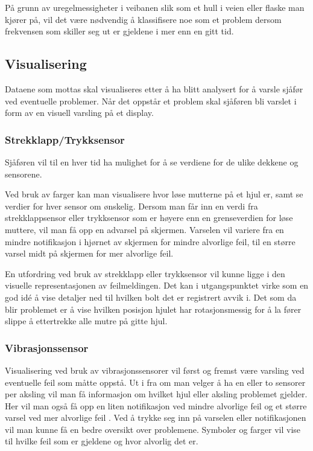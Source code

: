 På grunn av uregelmessigheter i veibanen slik som et hull i veien eller flaske 
man kjører på, vil det være nødvendig å klassifisere noe som et problem dersom 
frekvensen som skiller seg ut er gjeldene i mer enn en gitt tid.

\subsection{Visualisering}
Dataene som mottas skal visualiseres etter å ha blitt analysert for å varsle 
sjåfør ved eventuelle problemer. Når det oppstår et problem skal sjåføren bli 
varslet i form av en visuell varsling på et display.

\subsubsection{Strekklapp/Trykksensor}
Sjåføren vil til en hver tid ha mulighet for å se verdiene for de ulike dekkene 
og sensorene. 

Ved bruk av farger kan man visualisere hvor løse mutterne på et hjul er, samt se 
verdier for hver sensor om ønskelig. Dersom man får inn en verdi fra 
strekklappsensor eller trykksensor som er høyere enn en grenseverdien for løse 
muttere, vil man få opp en advarsel på skjermen. Varselen vil variere fra en 
mindre notifikasjon i hjørnet av skjermen for mindre alvorlige feil, til en 
større varsel midt på skjermen for mer alvorlige feil.

En utfordring ved bruk av strekklapp eller trykksensor vil kunne ligge i den 
visuelle representasjonen av feilmeldingen. Det kan i utgangspunktet virke som 
en god idé å vise detaljer ned til hvilken bolt det er registrert avvik i. Det 
som da blir problemet er å vise hvilken posisjon hjulet har rotasjonsmessig for 
å la fører slippe å ettertrekke alle mutre på gitte hjul.

\subsubsection{Vibrasjonssensor}
Visualisering ved bruk av vibrasjonssensorer vil først og fremst være varsling 
ved eventuelle feil som måtte oppstå. Ut i fra om man velger å ha en eller to 
sensorer per aksling vil man få informasjon om hvilket hjul eller aksling 
problemet gjelder. Her vil man også få opp en liten notifikasjon ved mindre 
alvorlige feil og et større varsel ved mer alvorlige feil . Ved å trykke seg 
inn på varselen eller notifikasjonen vil man kunne få en bedre oversikt over 
problemene. Symboler og farger vil vise til hvilke feil som er gjeldene og hvor 
alvorlig det er.

